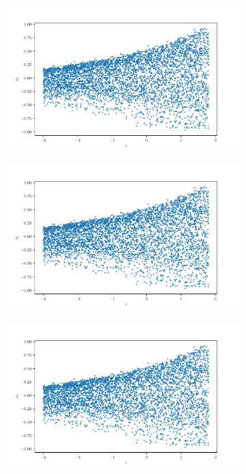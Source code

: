 \documentclass[10pt,a4paper]{article}
\begin{document}
\begin{figure}[!ht]
\begin{subfigure}{0.3\textwidth}
        \caption{}
        \label{cfig_yz2}
    \end{subfigure}
    \begin{subfigure}{0.3\textwidth}
        \centering
        \includegraphics[width=\textwidth] {cube_trans_z_z2.pdf}
        \caption{}
        \label{cfig_zzo}
    \end{subfigure}
    \begin{subfigure}{0.3\textwidth}
        \centering	
        \includegraphics[width=\textwidth]{cube_trans_z_z2.pdf}
        \caption{}
        \label{cfig_zz1}
    \end{subfigure}
    \begin{subfigure}{0.3\textwidth}
        \centering	
        \includegraphics[width=\textwidth]{cube_trans_z_z2.pdf}

\end{subfigure}
\end{figure}
\end{document}
